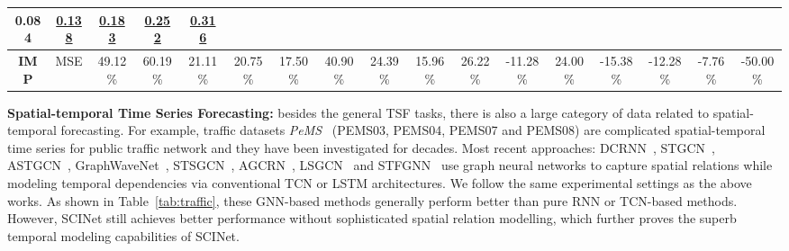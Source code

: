 \documentclass{article}
\begin{document}
\begin{table*}[htbp]
{\begin{tabular}{c|c|c|c|c|c|c|c|c|c|c|c|c|c|c|c|c}
 \textbf{0.084} & {\color[RGB]{0, 100, 148} \underline{0.138}} & {\color[RGB]{0, 100, 148} \underline{0.183}} & {\color[RGB]{0, 100, 148} \underline{0.252}} & {\color[RGB]{0, 100, 148} \underline{0.316}} \\ \hline
\multirow{1}{*}{\textbf{IMP}}              & MSE                               & {\color[RGB]{230, 57, 70} 49.12\%}                & {\color[RGB]{230, 57, 70} 60.19\%}                & {\color[RGB]{230, 57, 70} 21.11\%}                & {\color[RGB]{230, 57, 70} 20.75\%}                & {\color[RGB]{230, 57, 70} 17.50\%}              & {\color[RGB]{230, 57, 70} 40.90\%}                & {\color[RGB]{230, 57, 70} 24.39\%}                & {\color[RGB]{230, 57, 70} 15.96\%}               & {\color[RGB]{230, 57, 70} 26.22\%}               & {\color[RGB]{230, 57, 70} -11.28\%}               & {\color[RGB]{230, 57, 70} 24.00\%}                & {\color[RGB]{230, 57, 70} -15.38\%}                & {\color[RGB]{230, 57, 70} -12.28\%}                & {\color[RGB]{230, 57, 70} -7.76\%}               &  {\color[RGB]{230, 57, 70} -50.00\%}                    \\\hline
\end{tabular}}
\label{tab:etth_u}
\end{table*}





\vspace{3pt}
\textbf{Spatial-temporal Time Series Forecasting:} besides the general TSF tasks, there is also a large category of data related to spatial-temporal forecasting. For example, traffic datasets \emph{PeMS}~\citep{Chen2001FreewayPM} (PEMS03,
PEMS04, PEMS07 and PEMS08) are complicated spatial-temporal time series for public traffic network and they have been investigated for decades. Most recent approaches: DCRNN~\cite{li2018diffusion}, STGCN~\cite{Yu2018SpatioTemporalGC}, ASTGCN~\cite{Guo2019AttentionBS}, GraphWaveNet~\cite{Wu2019GraphWF}, STSGCN~\cite{Song2020SpatialTemporalSG}, AGCRN~\cite{bai2020adaptive}, LSGCN~\cite{Huang2020LSGCNLS} and STFGNN~\cite{li2021spatial} use graph neural networks to capture spatial relations while modeling temporal dependencies via conventional TCN or LSTM architectures. We follow the same experimental settings as the above works. As shown in Table~\ref{tab:traffic}, these GNN-based methods generally perform better than pure RNN or TCN-based methods. However, SCINet still achieves better performance without sophisticated spatial relation modelling, which further proves the superb temporal modeling capabilities of SCINet. 
\end{document}
